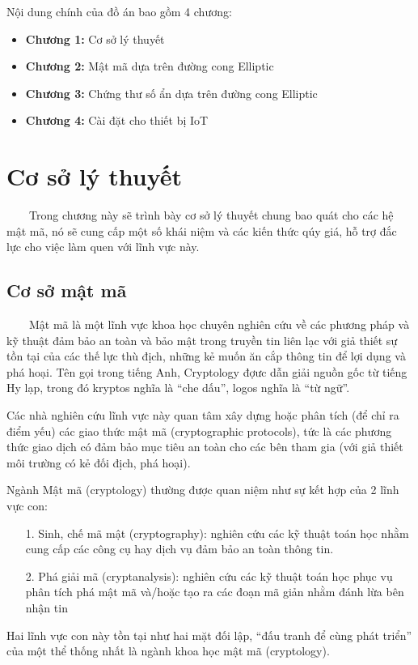 \documentclass[a4paper,12pt]{report}
\begin{document}
Nội dung chính của đồ án bao gồm 4 chương:
\begin{itemize}
\item \textbf{Chương 1:} Cơ sở lý thuyết
\item \textbf{Chương 2:} Mật mã dựa trên đường cong Elliptic
\item \textbf{Chương 3:} Chứng thư số ẩn dựa trên đường cong Elliptic
\item \textbf{Chương 4:} Cài đặt cho thiết bị IoT
\end{itemize}
\chapter{Cơ sở lý thuyết}
\ \ \ \ Trong chương này sẽ trình bày cơ sở lý thuyết chung bao quát cho các hệ mật mã, nó sẽ cung cấp một số khái niệm và các kiến thức qúy giá, hỗ trợ đắc lực cho việc làm quen với lĩnh vực này.
\section{Cơ sở mật mã}
\ \ \ \ Mật mã là một lĩnh vực khoa học chuyên nghiên cứu về các phương pháp và kỹ thuật đảm bảo an toàn và bảo mật trong truyền tin liên lạc với giả thiết sự tồn tại của
các thế lực thù địch, những kẻ muốn ăn cắp thông tin để lợi dụng và phá hoại. Tên gọi trong tiếng Anh, Cryptology đợưc dẫn giải nguồn gốc từ tiếng Hy lạp, trong đó kryptos nghĩa là “che dấu”, logos nghĩa là “từ ngữ”.

Các nhà nghiên cứu lĩnh vực này quan tâm xây dựng hoặc phân tích (để chỉ ra điểm yếu) các giao thức mật mã (cryptographic protocols), tức là các phương thức giao dịch có đảm bảo mục tiêu an toàn cho các bên tham gia (với giả thiết môi trường có kẻ đối địch, phá hoại). 

Ngành Mật mã (cryptology) thường được quan niệm như sự kết hợp của 2 lĩnh vực con:
\begin{itemize}
\item[1. ] Sinh, chế mã mật (cryptography): nghiên cứu các kỹ thuật toán học nhằm cung cấp các công cụ hay dịch vụ đảm bảo an toàn thông tin.
\item[2. ] Phá giải mã (cryptanalysis): nghiên cứu các kỹ thuật toán học phục vụ phân tích phá mật mã và/hoặc tạo ra các đoạn mã giản nhằm đánh lừa bên nhận tin
\end{itemize}

Hai lĩnh vực con này tồn tại như hai mặt đối lập, “đấu tranh để cùng phát triển”
của một thể thống nhất là ngành khoa học mật mã (cryptology).
\end{document}
